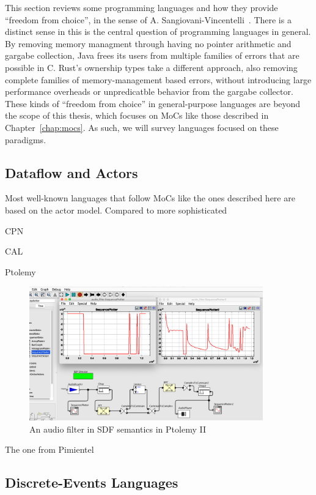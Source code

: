 This section reviews some programming languages and how they provide ``freedom from choice'', in the sense of A. Sangiovani-Vincentelli~\cite{lee2019freedom}.
There is a distinct sense in this is the central question of programming languages in general.
By removing memory managment through having no pointer arithmetic and gargabe collection, Java frees its users from multiple families of errors that are possible in C.
Rust's ownership types take a different approach, also removing complete families of memory-management based errors, without introducing large performance overheads or unpredicatble behavior from the gargabe collector.
These kinds of ``freedom from choice'' in general-purpose languages are beyond the scope of this thesis, which focuses on \acp{MoC} like those described in Chapter~\ref{chap:mocs}.
As such, we will survey languages focused on these paradigms.

\subsection{Dataflow and Actors}
Most well-known languages that follow \acp{MoC} like the ones described here are based on the actor model.
Compared to more sophisticated

CPN

CAL

Ptolemy
\begin{figure}[t]
	\centering
	\includegraphics[width=0.9\textwidth]{figures/audio_filter_ptolemy_screenshot.png}
	\caption{An audio filter in \ac{SDF} semantics in Ptolemy II}
	\label{fig:audio_filter_ptolemy}
\end{figure}

The one from Pimientel

\subsection{Discrete-Events Languages}

